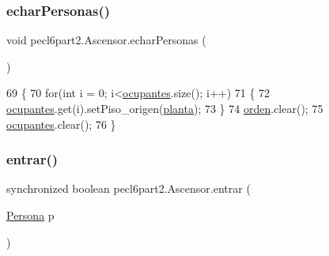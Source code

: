 \subsubsection{\texorpdfstring{echar\+Personas()}{echarPersonas()}}
{\footnotesize\ttfamily void pecl6part2.\+Ascensor.\+echar\+Personas (\begin{DoxyParamCaption}{ }\end{DoxyParamCaption})\hspace{0.3cm}{\ttfamily [inline]}}


\begin{DoxyCode}
69     \{
70         \textcolor{keywordflow}{for}(\textcolor{keywordtype}{int} i = 0; i<\mbox{\hyperlink{classpecl6part2_1_1_ascensor_af4dd01a24c9588e94061d4e61045563a}{ocupantes}}.size(); i++)
71         \{
72             \mbox{\hyperlink{classpecl6part2_1_1_ascensor_af4dd01a24c9588e94061d4e61045563a}{ocupantes}}.get(i).setPiso\_origen(\mbox{\hyperlink{classpecl6part2_1_1_ascensor_a66017643cc6554b17d447867a0c0d619}{planta}});
73         \}
74         \mbox{\hyperlink{classpecl6part2_1_1_ascensor_a92a9c3265671bd3d2654626f62094cf9}{orden}}.clear();
75         \mbox{\hyperlink{classpecl6part2_1_1_ascensor_af4dd01a24c9588e94061d4e61045563a}{ocupantes}}.clear();
76     \}
\end{DoxyCode}
\mbox{\label{classpecl6part2_1_1_ascensor_a39f39c41b77b0f31601a0afd10e38930}} 
\subsubsection{\texorpdfstring{entrar()}{entrar()}}
{\footnotesize\ttfamily synchronized boolean pecl6part2.\+Ascensor.\+entrar (\begin{DoxyParamCaption}\item[{\mbox{\hyperlink{classpecl6part2_1_1_persona}{Persona}}}]{p }\end{DoxyParamCaption})\hspace{0.3cm}{\ttfamily [inline]}}



